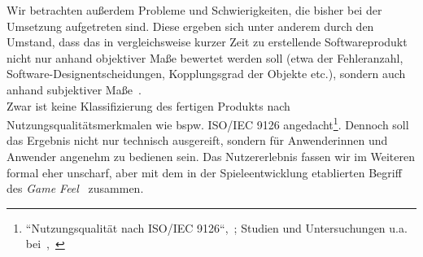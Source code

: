 Wir betrachten außerdem Probleme und Schwierigkeiten, die bisher bei der Umsetzung aufgetreten sind.
Diese ergeben sich unter anderem durch den Umstand, dass das in vergleichsweise kurzer Zeit zu erstellende Softwareprodukt nicht nur anhand objektiver Maße bewertet werden soll (etwa der Fehleranzahl, Software-Designentscheidungen, Kopplungsgrad der Objekte etc.), sondern auch anhand subjektiver Maße~\cite[385]{Bal08}.\\
Zwar ist keine Klassifizierung des fertigen Produkts nach Nutzungsqualitätsmerkmalen wie bspw. ISO/IEC 9126 angedacht\footnote{``Nutzungsqualität nach ISO/IEC 9126``,~\cite[466]{Bal08}; Studien und Untersuchungen u.a. bei~\cite[]{AZMK17},~\cite[]{Ber10}}.
Dennoch soll das Ergebnis nicht nur technisch ausgereift, sondern für Anwenderinnen und Anwender angenehm zu bedienen sein.
Das Nutzererlebnis fassen wir im Weiteren formal eher unscharf, aber mit dem in der Spieleentwicklung etablierten Begriff des \textit{Game Feel}~\cite[]{Swi08} zusammen.


